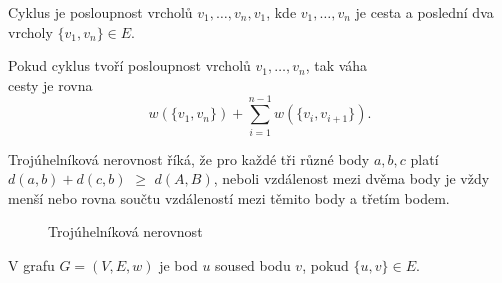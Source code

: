 \begin{definition}[Cyklus]
    \label{definice:cyklus}
    Cyklus je posloupnost vrcholů $v_1,\ldots,v_n,v_1$, kde $v_1,\ldots,v_n$ je cesta a poslední dva vrcholy $\{v_1,v_n\} \in E$.
\end{definition}

\begin{definition}
    \label{definice:vaha_cyklu}
    Pokud cyklus tvoří posloupnost vrcholů $v_1, \ldots, v_n$, tak váha \\cesty je rovna \[ w(\{v_1, v_n\}) + \sum_{i=1}^{n-1}w(\{v_i, v_{i+1}\}). \]
    
\end{definition}

\begin{definition}
    \label{definice:trojuhelnikova_nerovnost}
    Trojúhelníková nerovnost říká, že pro každé tři různé body $a, b, c$ platí \textcolor{myblue}{$d(a, b)+d(c, b)$} $\geq$ \textcolor{myred}{$d(A,B)$}, neboli vzdálenost mezi dvěma body je vždy menší nebo rovna součtu vzdáleností mezi těmito body a třetím bodem. 

    \begin{figure}[h]
        \centering
        \caption{Trojúhelníková nerovnost}
    \end{figure}

    \begin{definition}[Soused]
        \label{definice:soused}
        V grafu $G = (V, E, w)$ je bod $u$ soused bodu $v$, pokud $\{u, v\} \in E$.
    \end{definition}
    
\end{definition}